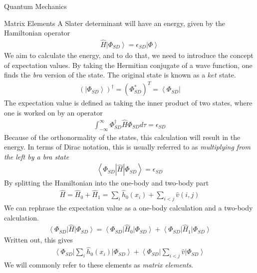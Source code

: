 \documentclass[twoside,english]{uiofysmaster}
\begin{document}
\begin{chapter}{Quantum Mechanics}
	\begin{section}{Matrix Elements}
		A Slater determinant will have an energy, given by the Hamiltonian operator
		\begin{align}
			\hat H \left| \Phi_{SD} \right> = \epsilon_{SD} \left| \Phi \right>
		\end{align}
		We aim to calculate the energy, and to do that, we need to introduce the concept of expectation values. By taking the Hermitian conjugate of a wave function, one finds the \textit{bra} version of the state. The original state is known as a $ket$ state. 
		\begin{align}
			\left( \left| \Phi_{SD} \right> \right)^\dagger = \left( \Phi_{SD}^* \right)^T = \left< \Phi_{SD} \right| 
		\end{align}
		The expectation value is defined as taking the inner product of two states, where one is worked on by an operator
		\begin{align}
			\int_{-\infty}^\infty \Phi_{SD}^\dagger \hat H \Phi_{SD} d \tau = \epsilon_{SD}
		\end{align}
		Because of the orthonormality of the states, this calculation will result in the energy. In terms of Dirac notation, this is usually referred to as \textit{multiplying from the left by a bra state}
		\begin{align}
			\left< \Phi_{SD} | \hat H | \Phi_{SD} \right> = \epsilon_{SD}
		\end{align}
		By splitting the Hamiltonian into the one-body and two-body part
		\begin{align}
			\hat H = \hat H_0 + \hat H_1 = \sum_i \hat h_0(x_i) + \sum_{i<j} \hat v(i,j)
		\end{align}
		We can rephrase the expectation value as a one-body calculation and a two-body calculation. 
		\begin{align}
			\left< \Phi_{SD} \right| \hat H \left| \Phi_{SD} \right> = \left< \Phi_{SD} \right| \hat H_0 \left| \Phi_{SD} \right> + \left< \Phi_{SD} \right| \hat H_1 \left| \Phi_{SD} \right>
		\end{align}
		Written out, this gives 
		\begin{align}
			\left< \Phi_{SD} \right| \sum_i \hat h_0(x_i) \left| \Phi_{SD} \right> + \left< \Phi_{SD} \right| \sum_{i<j} \hat v \left| \Phi_{SD} \right>
		\end{align}
		We will commonly refer to these elements as \textit{matrix elements}.


\end{section}
\end{chapter}
\end{document}
